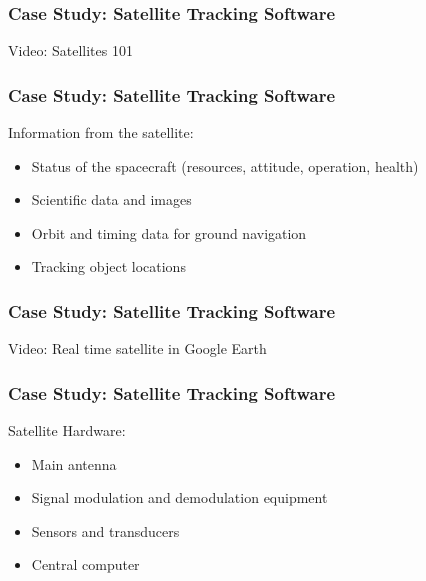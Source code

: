 \begin{frame}
	\frametitle{Case Study: Satellite Tracking Software}
	
	\begin{center}
	Video: Satellites 101
	\end{center}
	
\end{frame}


\begin{frame}
	\frametitle{Case Study: Satellite Tracking Software}
	
	\begin{changemargin}{1cm}
	Information from the satellite:
	\begin{itemize}
	\item Status of the spacecraft (resources, attitude, operation, health)
	\item Scientific data and images
	\item Orbit and timing data for ground navigation
	\item Tracking object locations
	\end{itemize}
	
	
	\end{changemargin}
	
\end{frame}


\begin{frame}
	\frametitle{Case Study: Satellite Tracking Software}
	
	\begin{center}
	Video: Real time satellite in Google Earth
	\end{center}
	
\end{frame}


\begin{frame}
	\frametitle{Case Study: Satellite Tracking Software}
	
	\begin{changemargin}{1cm}
		Satellite Hardware:
		\begin{itemize}
		\item Main antenna
		\item Signal modulation and demodulation equipment
		\item Sensors and transducers
		\item Central computer
	\end{itemize}	
    \end{changemargin}
\end{frame}

